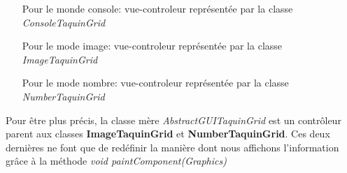 	\begin{itemize}
		\item [Pour le monde console:] vue-controleur représentée par la classe \textit{ConsoleTaquinGrid}
		\item [Pour le mode image:] vue-controleur représentée par la classe \textit{ImageTaquinGrid}
		\item [Pour le mode nombre:] vue-controleur représentée par la classe \textit{NumberTaquinGrid}
	\end{itemize}

	Pour être plus précis, la classe mère \textit{AbstractGUITaquinGrid} est un contrôleur parent aux classes \textbf{ImageTaquinGrid} et \textbf{NumberTaquinGrid}. Ces deux dernières ne font que de redéfinir la manière dont nous affichons l'information grâce à la méthode \textit{void paintComponent(Graphics)}
